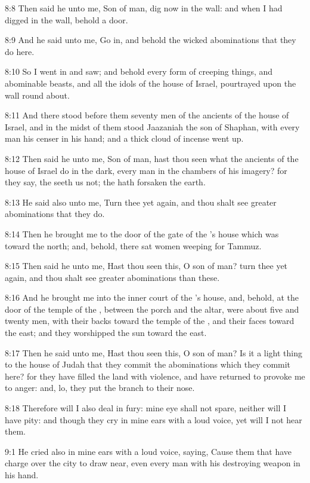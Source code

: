 8:8 Then said he unto me, Son of man, dig now in the wall: and when I
had digged in the wall, behold a door.

8:9 And he said unto me, Go in, and behold the wicked abominations
that they do here.

8:10 So I went in and saw; and behold every form of creeping things,
and abominable beasts, and all the idols of the house of Israel,
pourtrayed upon the wall round about.

8:11 And there stood before them seventy men of the ancients of the
house of Israel, and in the midst of them stood Jaazaniah the son of
Shaphan, with every man his censer in his hand; and a thick cloud of
incense went up.

8:12 Then said he unto me, Son of man, hast thou seen what the
ancients of the house of Israel do in the dark, every man in the
chambers of his imagery? for they say, the \LORD seeth us not; the \LORD
hath forsaken the earth.

8:13 He said also unto me, Turn thee yet again, and thou shalt see
greater abominations that they do.

8:14 Then he brought me to the door of the gate of the \LORD's house
which was toward the north; and, behold, there sat women weeping for
Tammuz.

8:15 Then said he unto me, Hast thou seen this, O son of man? turn
thee yet again, and thou shalt see greater abominations than these.

8:16 And he brought me into the inner court of the \LORD's house, and,
behold, at the door of the temple of the \LORD, between the porch and
the altar, were about five and twenty men, with their backs toward the
temple of the \LORD, and their faces toward the east; and they
worshipped the sun toward the east.

8:17 Then he said unto me, Hast thou seen this, O son of man? Is it a
light thing to the house of Judah that they commit the abominations
which they commit here? for they have filled the land with violence,
and have returned to provoke me to anger: and, lo, they put the branch
to their nose.

8:18 Therefore will I also deal in fury: mine eye shall not spare,
neither will I have pity: and though they cry in mine ears with a loud
voice, yet will I not hear them.

9:1 He cried also in mine ears with a loud voice, saying, Cause them
that have charge over the city to draw near, even every man with his
destroying weapon in his hand.

